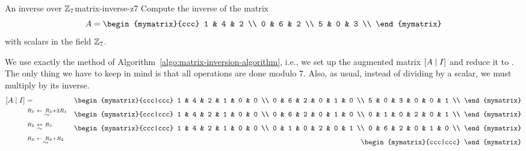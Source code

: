 \begin{example}{An inverse over $\mathbb{Z}_7$}{matrix-inverse-z7}
  Compute the inverse of the matrix
  \begin{equation*}
    A = \begin{mymatrix}{ccc}
      1 & 4 & 2 \\
      0 & 6 & 2 \\
      5 & 0 & 3 \\
    \end{mymatrix}
  \end{equation*}
  with scalars in the field $\mathbb{Z}_7$.
\end{example}

\begin{solution}
  We use exactly the method of
  Algorithm~\ref{algo:matrix-inversion-algorithm}, i.e., we set up the
  augmented matrix $\left[A\mid I\right]$ and reduce it to {\rref}. The only
  thing we have to keep in mind is that all operations are done modulo
  $7$. Also, as usual, instead of dividing by a scalar, we must
  multiply by its inverse.
  \begin{eqnarray*}
    \mat{A\mid I}
    &=&
        \begin{mymatrix}{ccc|ccc}
          1 & 4 & 2  &  1 & 0 & 0 \\
          0 & 6 & 2  &  0 & 1 & 0 \\
          5 & 0 & 3  &  0 & 0 & 1 \\
        \end{mymatrix}
    \\
    &\stackrel{R_3\rowop R_3+2R_1}{\sim}
      &
        \begin{mymatrix}{ccc|ccc}
          1 & 4 & 2  &  1 & 0 & 0 \\
          0 & 6 & 2  &  0 & 1 & 0 \\
          0 & 1 & 0  &  2 & 0 & 1 \\
        \end{mymatrix}
    \\
    &\stackrel{R_2\rowswap R_3}{\sim}
      &
        \begin{mymatrix}{ccc|ccc}
          1 & 4 & 2  &  1 & 0 & 0 \\
          0 & 1 & 0  &  2 & 0 & 1 \\
          0 & 6 & 2  &  0 & 1 & 0 \\
        \end{mymatrix}
    \\
    &\stackrel{R_3\rowop R_3+R_2}{\sim}
      &
        \begin{mymatrix}{ccc|ccc}

\end{mymatrix}
\end{eqnarray*}
\end{solution}
